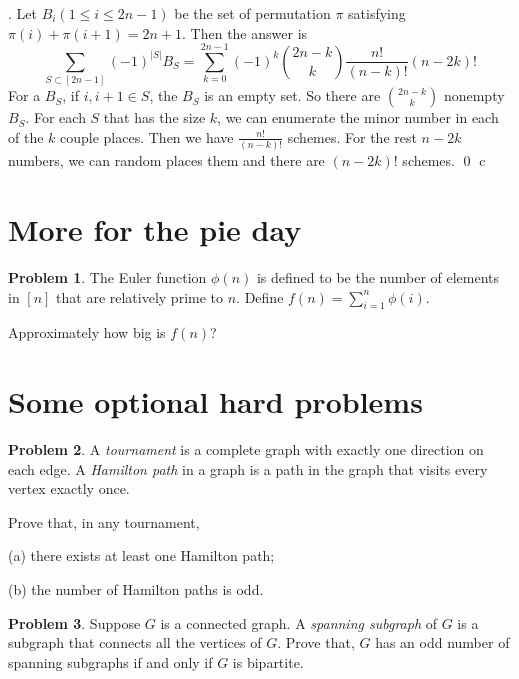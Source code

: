 \documentclass[12pt]{article}
\providecommand{\abs}[1]{\lvert#1\rvert}
\theoremstyle{definition}
\newtheorem{hw}{Problem}
\newenvironment{sol}
  {\par\vspace{3mm}\noindent{\it Solution}.}
  {\qed}
\begin{document}
\begin{sol}
	Let $B_i (1 \leq i \leq 2n-1)$ be the set of permutation $\pi$ satisfying $\pi(i) + \pi(i+1) = 2n + 1$. Then the answer is 
	$$
		\sum_{S \subset [2n-1]}(-1)^{\abs{S}}B_S = \sum_{k = 0}^{2n-1}(-1)^k\binom{2n-k}{k}\frac{n!}{(n-k)!}(n-2k)!
	$$
	For a $B_S$, if $i,i+1 \in S$, the $B_S$ is an empty set. So there are $\binom{2n-k}{k}$ nonempty $B_S$. For each $S$ that has the size $k$, we can enumerate the minor number in each of the $k$ couple places. Then we have $\frac{n!}{(n-k)!}$ schemes. For the rest $n-2k$ numbers, we can random places them and there are $(n-2k)!$ schemes. 
\end{sol}
c
\section{More for the pie day}

\begin{hw}
The Euler function $\phi(n)$ is defined to be the number of elements
in $[n]$ that are relatively prime to $n$. Define $f(n)= \sum_{i=1}^n
\phi(i)$.

Approximately how big is $f(n)$?
\end{hw}

\section{Some optional hard problems}

\begin{hw}
A {\em tournament} is a complete graph with exactly one direction on
each edge.
A {\em Hamilton path} in a graph is a path in the graph that visits
every vertex exactly once.

Prove that, in any tournament,

(a) there exists at least one Hamilton path;

(b) the number of Hamilton paths is odd.

\end{hw}

\begin{hw}
Suppose $G$ is a connected graph. A {\em spanning subgraph} of $G$ is
a subgraph that connects all the vertices of $G$. Prove that,
$G$ has an odd number of spanning subgraphs if and only if
$G$ is bipartite.
\end{hw}
\end{document}
